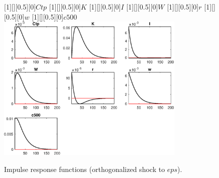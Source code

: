\begin{figure}[H]
[1][][0.5][0]{$Ctp$}
[1][][0.5][0]{$K$}
[1][][0.5][0]{$I$}
[1][][0.5][0]{$W$}
[1][][0.5][0]{$r$}
[1][][0.5][0]{$w$}
[1][][0.5][0]{$c500$}
\centering 
\includegraphics[width=0.80\textwidth]{DyReiter/graphs/DyReiter_IRF_eps3}
\caption{Impulse response functions (orthogonalized shock to $eps$).}\label{Fig:IRF:eps:3}
\end{figure}
 
 
